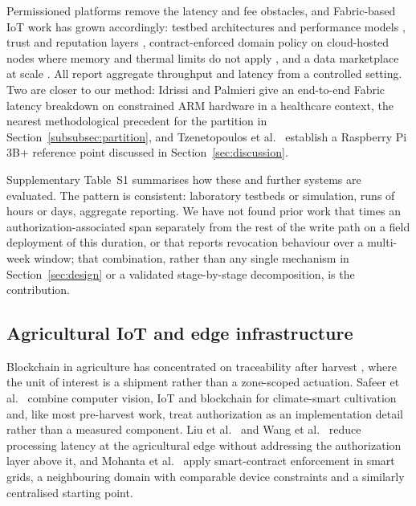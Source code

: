 \documentclass[a4paper,fleqn]{cas-sc}
\begin{document}
Permissioned platforms remove the latency and fee obstacles, and Fabric-based
IoT work has grown accordingly: testbed architectures and performance models
\cite{shih2022iiot,pajooh2022fabric_iot,kepark2023fabric_model}, trust and
reputation layers \cite{putra2021trust}, contract-enforced domain policy on
cloud-hosted nodes where memory and thermal limits do not apply
\cite{usman2024blockchain}, and a data marketplace at scale
\cite{gonzalez2023marketplace}. All report aggregate throughput and latency
from a controlled setting. Two are closer to our method: Idrissi and
Palmieri \cite{idrissi2024blockchain_jsupercomput} give an end-to-end Fabric
latency breakdown on constrained ARM hardware in a healthcare context, the
nearest methodological precedent for the partition in
Section~\ref{subsubsec:partition}, and Tzenetopoulos et
al.\ \cite{tzenetopoulos2022hlfkubed} establish a Raspberry Pi 3B+ reference
point discussed in Section~\ref{sec:discussion}.

Supplementary Table~S1 summarises how these and further systems
\cite{zaidi2023fabrication,bandara2021modeling} are evaluated. The pattern
is consistent: laboratory testbeds or simulation, runs of hours or days,
aggregate reporting. We have not found prior work that times an
authorization-associated span separately from the rest of the write path on
a field deployment of this duration, or that reports revocation behaviour
over a multi-week window; that combination, rather than any single
mechanism in Section~\ref{sec:design} or a validated stage-by-stage
decomposition, is the contribution.

\subsection{Agricultural IoT and edge infrastructure}
\label{subsec:rw_agri}

Blockchain in agriculture has concentrated on traceability after harvest
\cite{tian2017traceability,lin2018blockchain,bandara2021modeling}, where the
unit of interest is a shipment rather than a zone-scoped actuation. Safeer et
al.\ \cite{safeer2025agrifarming} combine computer vision, IoT and blockchain
for climate-smart cultivation and, like most pre-harvest work, treat
authorization as an implementation detail rather than a measured component.
Liu et al.\ \cite{liu2019edge} and Wang et al.\ \cite{wang2021edge} reduce
processing latency at the agricultural edge without addressing the
authorization layer above it, and Mohanta et al.\ \cite{mohanta2025smartgrid}
apply smart-contract enforcement in smart grids, a neighbouring domain with
comparable device constraints and a similarly centralised starting point.
\end{document}
